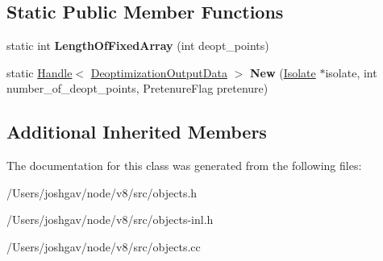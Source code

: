 \subsection*{Static Public Member Functions}
\begin{DoxyCompactItemize}
\item 
static int {\bfseries Length\+Of\+Fixed\+Array} (int deopt\+\_\+points)\hypertarget{classv8_1_1internal_1_1_deoptimization_output_data_aa706aa8c56eb61a7df6bed0379bf2021}{}\label{classv8_1_1internal_1_1_deoptimization_output_data_aa706aa8c56eb61a7df6bed0379bf2021}

\item 
static \hyperlink{classv8_1_1internal_1_1_handle}{Handle}$<$ \hyperlink{classv8_1_1internal_1_1_deoptimization_output_data}{Deoptimization\+Output\+Data} $>$ {\bfseries New} (\hyperlink{classv8_1_1internal_1_1_isolate}{Isolate} $\ast$isolate, int number\+\_\+of\+\_\+deopt\+\_\+points, Pretenure\+Flag pretenure)\hypertarget{classv8_1_1internal_1_1_deoptimization_output_data_aff5aa51b25b9b9d419acd8d6e777c7f0}{}\label{classv8_1_1internal_1_1_deoptimization_output_data_aff5aa51b25b9b9d419acd8d6e777c7f0}

\end{DoxyCompactItemize}
\subsection*{Additional Inherited Members}


The documentation for this class was generated from the following files\+:\begin{DoxyCompactItemize}
\item 
/\+Users/joshgav/node/v8/src/objects.\+h\item 
/\+Users/joshgav/node/v8/src/objects-\/inl.\+h\item 
/\+Users/joshgav/node/v8/src/objects.\+cc\end{DoxyCompactItemize}
